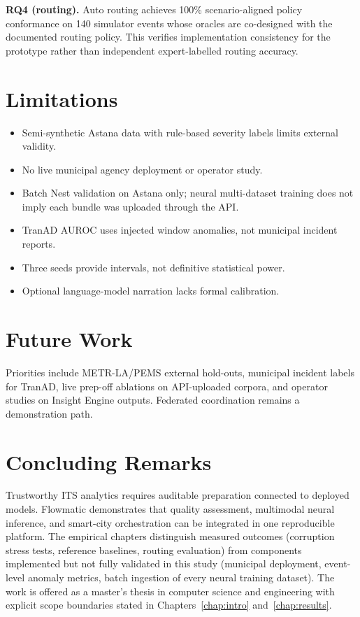 \textbf{RQ4 (routing).} Auto routing achieves 100\% scenario-aligned policy conformance on 140 simulator events whose oracles are co-designed with the documented routing policy. This verifies implementation consistency for the prototype rather than independent expert-labelled routing accuracy.

\section{Limitations}

\begin{itemize}
  \item Semi-synthetic Astana data with rule-based severity labels limits external validity.
  \item No live municipal agency deployment or operator study.
  \item Batch Nest validation on Astana only; neural multi-dataset training does not imply each bundle was uploaded through the API.
  \item TranAD AUROC uses injected window anomalies, not municipal incident reports.
  \item Three seeds provide intervals, not definitive statistical power.
  \item Optional language-model narration lacks formal calibration.
\end{itemize}

\section{Future Work}

Priorities include METR-LA/PEMS external hold-outs, municipal incident labels for TranAD, live prep-off ablations on API-uploaded corpora, and operator studies on Insight Engine outputs. Federated coordination remains a demonstration path.

\section{Concluding Remarks}

Trustworthy ITS analytics requires auditable preparation connected to deployed models. Flowmatic demonstrates that quality assessment, multimodal neural inference, and smart-city orchestration can be integrated in one reproducible platform. The empirical chapters distinguish measured outcomes (corruption stress tests, reference baselines, routing evaluation) from components implemented but not fully validated in this study (municipal deployment, event-level anomaly metrics, batch ingestion of every neural training dataset). The work is offered as a master's thesis in computer science and engineering with explicit scope boundaries stated in Chapters~\ref{chap:intro} and~\ref{chap:results}.
